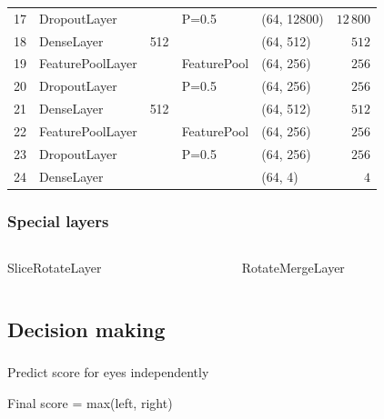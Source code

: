 \begin{frame}
\begin{table}[]
\begin{tabular}{@{}clcllr@{}}
17 & DropoutLayer              &      & P=0.5       & (64, 12800)         & $12\,800$   \\
18 & DenseLayer                & 512  &             & (64, 512)           & $512$     \\
19 & FeaturePoolLayer          &      & FeaturePool & (64, 256)           & $256$     \\
20 & DropoutLayer              &      & P=0.5       & (64, 256)           & $256$     \\
21 & DenseLayer                & 512  &             & (64, 512)           & $512$     \\
22 & FeaturePoolLayer          &      & FeaturePool & (64, 256)           & $256$     \\
23 & DropoutLayer              &      & P=0.5       & (64, 256)           & $256$     \\
24 & DenseLayer                &      &             & (64, 4)             & $4$       \\ \bottomrule
\end{tabular}
\end{table}

\end{frame}


\begin{frame}\frametitle{Special layers}

\begin{columns}
\begin{column}{5cm}
\par SliceRotateLayer


\end{column}
\begin{column}{5cm}
\par RotateMergeLayer
\end{column}
\end{columns}

\end{frame}


\subsection{Decision making}

\begin{frame}\frametitle{}
\par Predict score for eyes independently
\par Final score = max(left, right)
\end{frame}


